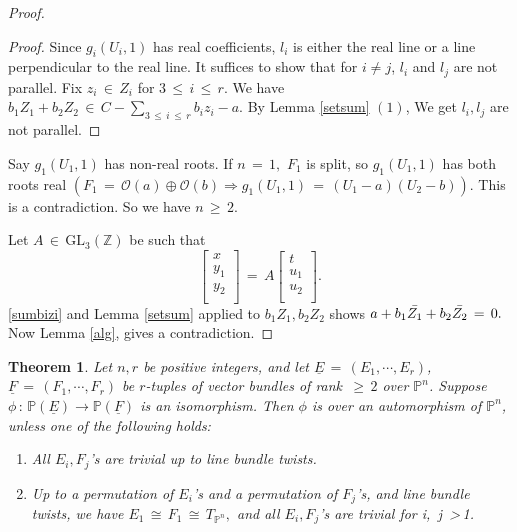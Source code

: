 \documentclass[12pt,reqno]{amsart}
\newtheorem{theorem}[lemma]{Theorem}
\theoremstyle{definition}
\numberwithin{equation}{section}
\begin{document}
\begin{proof}
\begin{proof}
    Since $g_i(U_i,1)$ has real coefficients, $l_i$ is either the real line or a line perpendicular to the real line. It suffices to show that for $i\neq j$, $l_i$ and $l_j$ are not parallel.
 Fix $z_i\,\in\, Z_i$ for $3\,\leq\, i\, \leq\, r.$ We have $b_1 Z_1+b_2Z_2\,\in\, C-\sum_{3\,\leq\, i\,\leq \,r}b_{i}z_{i} -a .$ By Lemma \ref{setsum} $(1)$, We get $l_i,l_j$ are not parallel.
 \end{proof}
Say $ g_{1}(U_1,1)$ has non-real roots. If $ n\,=\,1,$ $F_{1}$ is split, so $g_{1}(U_1,1)$ has both roots real $ ( F_{1} \,=\, \mathcal{O}(a) \oplus \mathcal{O}(b) \Rightarrow g_{1}(U_{1},1) \,=\, (U_{1}-a) (U_{2}-b))$. This is a contradiction. So we have $ n\, \geq\, 2.$     

Let $ A \,\in\, \textrm{GL}_{3}(\mathbb{Z})$ be such that 
\begin{equation*}
 \begin{bmatrix}
x\\
y_1\\
y_2\\
\end{bmatrix}
\,=\, A  \begin{bmatrix}
t\\
u_1\\
u_2\\
\end{bmatrix}.
\end{equation*}
\eqref{sumbizi} and Lemma \ref{setsum} applied to $b_1Z_1, b_2Z_2$ shows $a+ b_1\Bar{Z_1}+ b_2\Bar{Z_2}\,=\,0.$
Now Lemma \ref{alg}, gives a contradiction. 
\end{proof}
\begin{theorem} \label{auto}
Let $n,r$ be positive integers, and let $\underline{E}\,=\,(E_{1},\cdots,E_{r })$, $\underline{F}\,=\,(F_{1},\cdots,F_{r })$  be $r$-tuples of vector bundles of rank $\,\geq\, 2$ over $\mathbb{P}^n$. Suppose $ \phi\,:\, \mathbb{P}(\underline{E})\to \mathbb{P}(\underline{F})$ is an isomorphism.
Then $ \phi$ is over an automorphism of $ \mathbb{P}^n$, unless one of the following holds:
 \begin{enumerate}
\item[$(1)$] All $E_{i}, F_{j}$'s are trivial up to line bundle twists.
\item[$(2)$] Up to a permutation of $ E_{i}$'s and a permutation of $F_{j}$'s, and line bundle twists, we have $ E_{1} \,\cong\, F_{1} \,\cong\, T_{\mathbb{P}^n},$ and all $ E_{i},F_j$'s are trivial for  i,\, j \,>\,1.
\end{enumerate}
\end{theorem}
\end{document}
